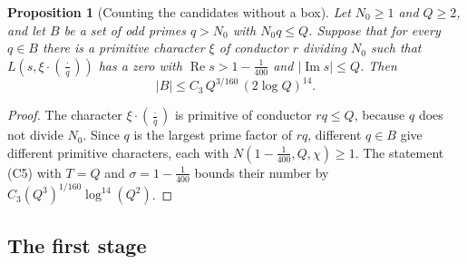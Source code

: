 \documentclass[11pt,letterpaper]{article}
\newtheorem{proposition}[theorem]{Proposition}
\numberwithin{equation}{section}
\begin{document}
\begin{proposition}[Counting the candidates without a box]\label{boxes}
Let $N_0\ge1$ and $Q\ge2$, and let $B$ be a set of odd primes $q>N_0$ with $N_0q\le Q$. Suppose that for every $q\in B$ there is a primitive character $\xi$ of conductor $r$ dividing $N_0$ such that $L(s,\xi\cdot(\tfrac{\cdot}{q}))$ has a zero with $\operatorname{Re}s>1-\tfrac1{400}$ and $|\operatorname{Im}s|\le Q$. Then
\[
|B|\le C_3\,Q^{3/160}\,(2\log Q)^{14}.
\]
\end{proposition}
\begin{proof}
The character $\xi\cdot(\tfrac{\cdot}{q})$ is primitive of conductor $rq\le Q$, because $q$ does not divide $N_0$. Since $q$ is the largest prime factor of $rq$, different $q\in B$ give different primitive characters, each with $N(1-\tfrac1{400},Q,\chi)\ge1$. The statement (C5) with $T=Q$ and $\sigma=1-\tfrac1{400}$ bounds their number by $C_3(Q^3)^{1/160}\log^{14}(Q^2)$.
\end{proof}

\subsection{The first stage}
\end{document}
